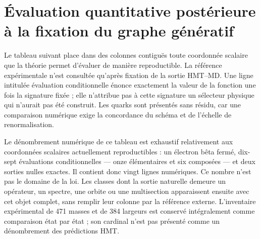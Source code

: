 \section{Évaluation quantitative postérieure à la fixation du graphe génératif}
Le tableau suivant place dans des colonnes contiguës toute coordonnée scalaire que la théorie permet d’évaluer de manière reproductible. La référence expérimentale n’est consultée qu’après fixation de la sortie HMT--MD. Une ligne intitulée évaluation conditionnelle énonce exactement la valeur de la fonction une fois la signature fixée ; elle n’attribue pas à cette signature un sélecteur physique qui n’aurait pas été construit. Les quarks sont présentés sans résidu, car une comparaison numérique exige la concordance du schéma et de l’échelle de renormalisation.

Le dénombrement numérique de ce tableau est exhaustif relativement aux coordonnées scalaires actuellement reproductibles : un électron bêta fermé, dix-sept évaluations conditionnelles --- onze élémentaires et six composées --- et deux sorties nulles exactes. Il contient donc vingt lignes numériques. Ce nombre n’est pas le domaine de la loi. Les classes dont la sortie naturelle demeure un opérateur, un spectre, une orbite ou une multisection apparaissent ensuite avec cet objet complet, sans remplir leur colonne par la référence externe. L’inventaire expérimental de 471 masses et de 384 largeurs est conservé intégralement comme comparaison état par état ; son cardinal n’est pas présenté comme un dénombrement des prédictions HMT.

